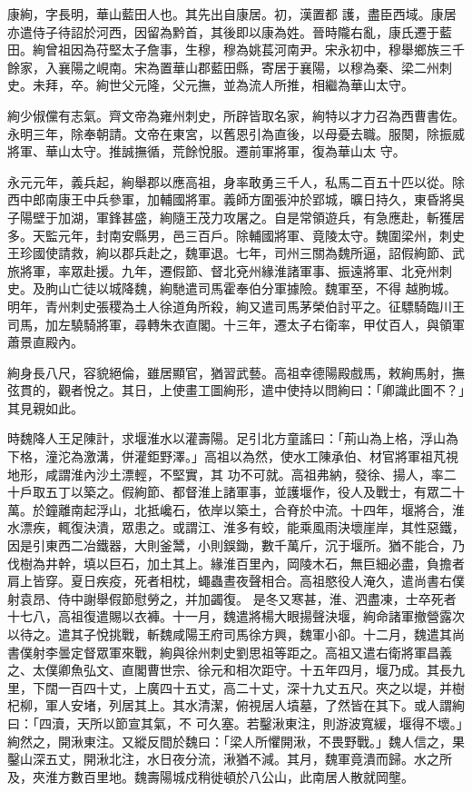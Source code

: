\begin{pinyinscope}
 康絢，字長明，華山藍田人也。其先出自康居。初，漢置都
 護，盡臣西域。康居亦遣侍子待詔於河西，因留為黔首，其後即以康為姓。晉時隴右亂，康氏遷于藍田。絢曾祖因為苻堅太子詹事，生穆，穆為姚萇河南尹。宋永初中，穆舉鄉族三千餘家，入襄陽之峴南。宋為置華山郡藍田縣，寄居于襄陽，以穆為秦、梁二州刺史。未拜，卒。絢世父元隆，父元撫，並為流人所推，相繼為華山太守。



 絢少俶儻有志氣。齊文帝為雍州刺史，所辟皆取名家，絢特以才力召為西曹書佐。永明三年，除奉朝請。文帝在東宮，以舊恩引為直後，以母憂去職。服闋，除振威將軍、華山太守。推誠撫循，荒餘悅服。遷前軍將軍，復為華山太
 守。



 永元元年，義兵起，絢舉郡以應高祖，身率敢勇三千人，私馬二百五十匹以從。除西中郎南康王中兵參軍，加輔國將軍。義師方圍張沖於郢城，曠日持久，東昏將吳子陽壁于加湖，軍鋒甚盛，絢隨王茂力攻屠之。自是常領遊兵，有急應赴，斬獲居多。天監元年，封南安縣男，邑三百戶。除輔國將軍、竟陵太守。魏圍梁州，刺史王珍國使請救，絢以郡兵赴之，魏軍退。七年，司州三關為魏所逼，詔假絢節、武旅將軍，率眾赴援。九年，遷假節、督北兗州緣淮諸軍事、振遠將軍、北兗州刺史。及朐山亡徒以城降魏，絢馳遣司馬霍奉伯分軍據險。魏軍至，不得
 越朐城。明年，青州刺史張稷為土人徐道角所殺，絢又遣司馬茅榮伯討平之。征驃騎臨川王司馬，加左驍騎將軍，尋轉朱衣直閣。十三年，遷太子右衛率，甲仗百人，與領軍蕭景直殿內。



 絢身長八尺，容貌絕倫，雖居顯官，猶習武藝。高祖幸德陽殿戲馬，敕絢馬射，撫弦貫的，觀者悅之。其日，上使畫工圖絢形，遣中使持以問絢曰：「卿識此圖不？」其見親如此。



 時魏降人王足陳計，求堰淮水以灌壽陽。足引北方童謠曰：「荊山為上格，浮山為下格，潼沱為激溝，併灌鉅野澤。」高祖以為然，使水工陳承伯、材官將軍祖芃視地形，咸謂淮內沙土漂輕，不堅實，其
 功不可就。高祖弗納，發徐、揚人，率二十戶取五丁以築之。假絢節、都督淮上諸軍事，並護堰作，役人及戰士，有眾二十萬。於鐘離南起浮山，北抵巉石，依岸以築土，合脊於中流。十四年，堰將合，淮水漂疾，輒復決潰，眾患之。或謂江、淮多有蛟，能乘風雨決壞崖岸，其性惡鐵，因是引東西二冶鐵器，大則釜鬵，小則鋘鋤，數千萬斤，沉于堰所。猶不能合，乃伐樹為井幹，填以巨石，加土其上。緣淮百里內，岡陵木石，無巨細必盡，負擔者肩上皆穿。夏日疾疫，死者相枕，蠅蟲晝夜聲相合。高祖愍役人淹久，遣尚書右僕射袁昂、侍中謝舉假節慰勞之，并加蠲復。
 是冬又寒甚，淮、泗盡凍，士卒死者十七八，高祖復遣賜以衣褲。十一月，魏遣將楊大眼揚聲決堰，絢命諸軍撤營露次以待之。遣其子悅挑戰，斬魏咸陽王府司馬徐方興，魏軍小卻。十二月，魏遣其尚書僕射李曇定督眾軍來戰，絢與徐州刺史劉思祖等距之。高祖又遣右衛將軍昌義之、太僕卿魚弘文、直閣曹世宗、徐元和相次距守。十五年四月，堰乃成。其長九里，下闊一百四十丈，上廣四十五丈，高二十丈，深十九丈五尺。夾之以堤，并樹杞柳，軍人安堵，列居其上。其水清潔，俯視居人墳墓，了然皆在其下。或人謂絢曰：「四瀆，天所以節宣其氣，不
 可久塞。若鑿湫東注，則游波寬緩，堰得不壞。」絢然之，開湫東注。又縱反間於魏曰：「梁人所懼開湫，不畏野戰。」魏人信之，果鑿山深五丈，開湫北注，水日夜分流，湫猶不減。其月，魏軍竟潰而歸。水之所及，夾淮方數百里地。魏壽陽城戍稍徙頓於八公山，此南居人散就岡壟。




\end{pinyinscope}
